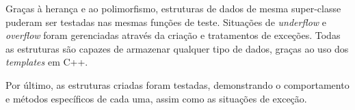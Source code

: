 Graças à herança e ao polimorfismo, estruturas de dados de mesma super-classe puderam ser testadas nas mesmas funções de teste. Situações de \emph{underflow} e \emph{overflow} foram gerenciadas através da criação e tratamentos de exceções. Todas as estruturas são capazes de armazenar qualquer tipo de dados, graças ao uso dos \emph{templates} em C++.

Por último, as estruturas criadas foram testadas, demonstrando o comportamento e métodos específicos de cada uma, assim como as situações de exceção. 
